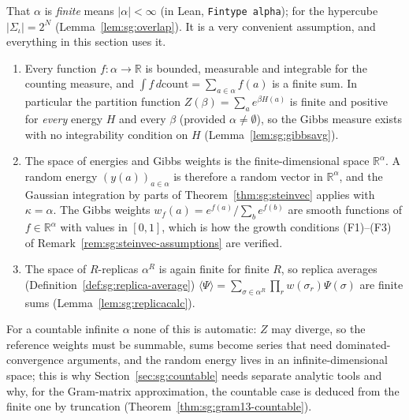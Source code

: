 \begin{remark}\label{rem:sg:finiteconfig}
That $\alpha$ is \emph{finite} means $|\alpha|<\infty$ (in Lean, \texttt{Fintype alpha}); for the hypercube $|\Sigma_\iota|=2^N$
(Lemma~\ref{lem:sg:overlap}). It is a very convenient assumption, and everything in this section uses it.
\begin{enumerate}
\item Every function $f:\alpha\to\mathbb R$ is bounded, measurable and integrable for the counting measure, and
  $\int f\,d\mathrm{count}=\sum_{a\in\alpha}f(a)$ is a finite sum. In particular the partition function
  $Z(\beta)=\sum_ae^{\beta H(a)}$ is finite and positive for \emph{every} energy $H$ and every $\beta$ (provided
  $\alpha\ne\emptyset$), so the Gibbs measure exists with no integrability condition on $H$ (Lemma~\ref{lem:sg:gibbsavg}).
\item The space of energies and Gibbs weights is the finite-dimensional space $\mathbb R^\alpha$. A random energy
  $(y(a))_{a\in\alpha}$ is therefore a random vector in $\mathbb R^\alpha$, and the Gaussian integration by parts of
  Theorem~\ref{thm:sg:steinvec} applies with $\kappa=\alpha$. The Gibbs weights $w_f(a)=e^{f(a)}/\sum_be^{f(b)}$ are smooth
  functions of $f\in\mathbb R^\alpha$ with values in $[0,1]$, which is how the growth conditions (F1)--(F3) of
  Remark~\ref{rem:sg:steinvec-assumptions} are verified.
\item The space of $R$-replicas $\alpha^R$ is again finite for finite $R$, so replica averages (Definition~\ref{def:sg:replica-average})
  $\langle\Psi\rangle=\sum_{\sigma\in\alpha^R}\prod_rw(\sigma_r)\Psi(\sigma)$ are finite sums (Lemma~\ref{lem:sg:replicacalc}).
\end{enumerate}
For a countable infinite $\alpha$ none of this is automatic: $Z$ may diverge, so the reference weights must be summable, sums
become series that need dominated-convergence arguments, and the random energy lives in an infinite-dimensional space; this is
why Section~\ref{sec:sg:countable} needs separate analytic tools and why, for the Gram-matrix approximation, the countable case
is deduced from the finite one by truncation (Theorem~\ref{thm:sg:gram13-countable}).
\end{remark}


